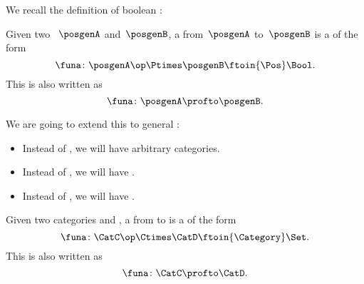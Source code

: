 We recall the definition of boolean :

\begin{ctdefinition}
    \label{def:boolean-profunctor-again}
    Given two ~$\posgenA$ and~$\posgenB$, a  from~$\posgenA$ to~$\posgenB$ is a  of the form
    \begin{equation}
        \label{eq:boolean-profunctor-funa}
        \funa\colon \posgenA\op \Ptimes \posgenB \ftoin{\Pos} \Bool.
    \end{equation}
    This is also written as
    \begin{equation}
        \funa\colon \posgenA \profto \posgenB.
    \end{equation}
\end{ctdefinition}

We are going to extend this to general :
\begin{itemize}
    \item Instead of , we will have arbitrary categories.
    \item Instead of \Bool, we will have \Set.
    \item Instead of  , we will have .
\end{itemize}

\begin{ctdefinition}[Profunctors]
    \label{def:profunctor}
    Given two categories \CatC and \CatD, a  from \CatC to \CatD is a  of the form
    \begin{equation}
        \label{eq:profunctors-def-1}
        \funa\colon \CatC\op \Ctimes \CatD \ftoin{\Category} \Set.
    \end{equation}
    This is also written as
    \begin{equation}
        \label{eq:profunctors-def-2}
        \funa\colon \CatC \profto \CatD.
    \end{equation}
\end{ctdefinition}

